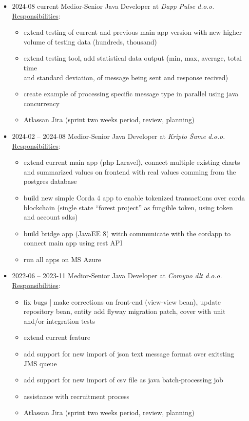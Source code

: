 \documentclass[12pt]{article}
\begin{document}
\begin{itemize}
    \setlength\itemsep{0em}
    \item 2024-08 current Medior-Senior Java Developer at \textit{Dapp Pulse d.o.o.} \\
        \underline{Responsibilities}:
        \begin{itemize}
            \setlength\itemsep{0em}
            \item extend testing of current and previous main app version with new higher volume of testing data (hundreds, thousand)
            \item extend testing tool, add statistical data output (min, max, average, total time \\ and standard deviation, of message being sent and response recived)
            \item create example of processing specific message type in parallel using java concurrency
            \item Atlassan Jira (sprint two weeks period, review, planning)
        \end{itemize}
    \item 2024-02 -- 2024-08 Medior-Senior Java Developer at \textit{Kripto Šume d.o.o.} \\
        \underline{Responsibilities}:
        \begin{itemize}
            \setlength\itemsep{0em}
            \item extend current main app (php Laravel), connect multiple existing charts and summarized values on frontend with real values comming from the postgres database
            \item build new simple Corda 4 app to enable tokenized transactions over corda blockchain (single state “forest project” as fungible token, using token and account sdks)
            \item build bridge app (JavaEE 8) witch communicate with the cordapp to connect main app using rest API
            \item run all apps on MS Azure
        \end{itemize}
    \item 2022-06 -- 2023-11 Medior-Senior Java Developer at \textit{Comyno dlt d.o.o.} \\
        \underline{Responsibilities}:
        \begin{itemize}
            \setlength\itemsep{0em}
            \item fix bugs | make corrections on front-end (view-view bean), update repository bean, entity add flyway migration patch, cover with unit and/or integration tests 
            \item extend current feature
            \item add support for new import of json text message format over exitsting JMS queue 
            \item add support for new import of csv file as java batch-processing job
            \item assistance with recruitment process
            \item Atlassan Jira (sprint two weeks period, review, planning)
        \end{itemize}


\end{itemize}
\end{document}
